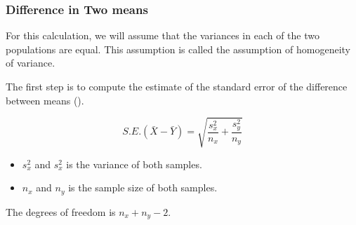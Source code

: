 \documentclass[a4]{beamer}
\begin{document}
\begin{frame}
\frametitle{Difference in Two means}
For this calculation, we will assume that the variances in each of the two populations are equal. This assumption is called the assumption of homogeneity of variance.

The first step is to compute the estimate of the standard error of the difference between means ().

\[ S.E.(\bar{X}-\bar{Y}) = \sqrt{\frac{s^2_x}{n_x} + \frac{s^2_y}{n_y}} \]

\begin{itemize}
\item $s^2_x$ and $s^2_x$ is the variance of both samples.
\item $n_x$ and $n_y$ is the sample size of both samples.
\end{itemize}
The degrees of freedom is $n_x + n_y -2$.
\end{frame}
\end{document}
